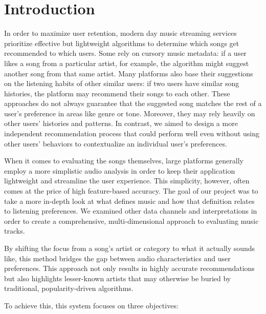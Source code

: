 \section{Introduction}
\label{sec:intro}

In order to maximize user retention, modern day music streaming services prioritize effective but lightweight algorithms to determine which songs get recommended to which users. Some rely on cursory music metadata: if a user likes a song from a particular artist, for example, the algorithm might suggest another song from that same artist. Many platforms also base their suggestions on the listening habits of other similar users: if two users have similar song histories, the platform may recommend their songs to each other. These approaches do not always guarantee that the suggested song matches the rest of a user’s preference in areas like genre or tone. Moreover, they may rely heavily on other users’ histories and patterns. In contrast, we aimed to design a more independent recommendation process that could perform well even without using other users’ behaviors to contextualize an individual user’s preferences.

When it comes to evaluating the songs themselves, large platforms generally employ a more simplistic audio analysis in order to keep their application lightweight and streamline the user experience. This simplicity, however, often comes at the price of high feature-based accuracy. The goal of our project was to take a more in-depth look at what defines music and how that definition relates to listening preferences. We examined other data channels and interpretations in order to create a comprehensive, multi-dimensional approach to evaluating music tracks.

By shifting the focus from a song's artist or category to what it actually sounds like, this method bridges the gap between audio characteristics and user preferences. This approach not only results in highly accurate recommendations but also highlights lesser-known artists that may otherwise be buried by traditional, popularity-driven algorithms.

To achieve this, this system focuses on three objectives:

